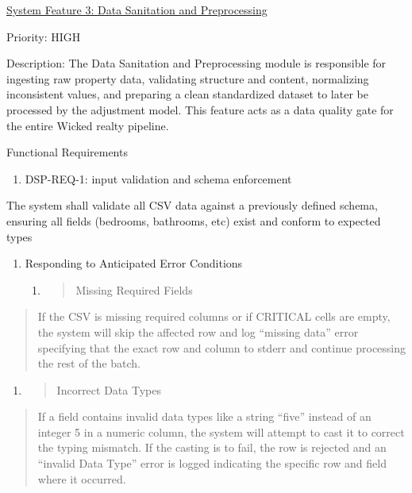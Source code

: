 \documentclass[
]{article}
\begin{document}
\ul{System Feature 3: Data Sanitation and Preprocessing}

Priority: HIGH

Description: The Data Sanitation and Preprocessing module is responsible
for ingesting raw property data, validating structure and content,
normalizing inconsistent values, and preparing a clean standardized
dataset to later be processed by the adjustment model. This feature acts
as a data quality gate for the entire Wicked realty pipeline.

Functional Requirements

\begin{enumerate}
\def\labelenumi{\Roman{enumi})}
\item
  DSP-REQ-1: input validation and schema enforcement
\end{enumerate}

The system shall validate all CSV data against a previously defined
schema, ensuring all fields (bedrooms, bathrooms, etc) exist and conform
to expected types

\begin{enumerate}
\def\labelenumi{\alph{enumi}.}
\item
  Responding to Anticipated Error Conditions

  \begin{enumerate}
  \def\labelenumii{\roman{enumii}.}
  \item
    \begin{quote}
    Missing Required Fields
    \end{quote}
  \end{enumerate}
\end{enumerate}

\begin{quote}
If the CSV is missing required columns or if CRITICAL cells are empty,
the system will skip the affected row and log ``missing data'' error
specifying that the exact row and column to stderr and continue
processing the rest of the batch.
\end{quote}

\begin{enumerate}
\def\labelenumi{\roman{enumi}.}
\setcounter{enumi}{1}
\item
  \begin{quote}
  Incorrect Data Types
  \end{quote}
\end{enumerate}

\begin{quote}
If a field contains invalid data types like a string ``five'' instead of
an integer 5 in a numeric column, the system will attempt to cast it to
correct the typing mismatch. If the casting is to fail, the row is
rejected and an ``invalid Data Type'' error is logged indicating the
specific row and field where it occurred.
\end{quote}
\end{document}
